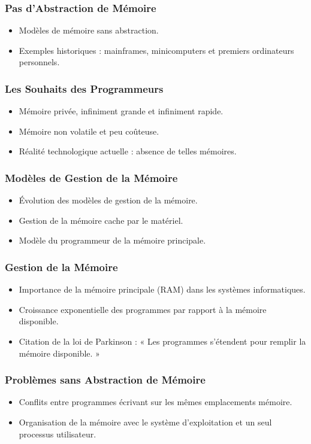 \documentclass[10pt]{beamer}
\begin{document}
\begin{frame}
    \frametitle{Pas d'Abstraction de Mémoire}
    \begin{itemize}
        \item Modèles de mémoire sans abstraction.
        \item Exemples historiques : mainframes, minicomputers et premiers
              ordinateurs personnels.
    \end{itemize}
\end{frame}

\begin{frame}
    \frametitle{Les Souhaits des Programmeurs}
    \begin{itemize}
        \item Mémoire privée, infiniment grande et infiniment rapide.
        \item Mémoire non volatile et peu coûteuse.
        \item Réalité technologique actuelle : absence de telles mémoires.
    \end{itemize}
\end{frame}

\begin{frame}
    \frametitle{Modèles de Gestion de la Mémoire}
    \begin{itemize}
        \item Évolution des modèles de gestion de la mémoire.
        \item Gestion de la mémoire cache par le matériel.
        \item Modèle du programmeur de la mémoire principale.
    \end{itemize}
\end{frame}

\begin{frame}
    \frametitle{Gestion de la Mémoire}
    \begin{itemize}
        \item Importance de la mémoire principale (RAM) dans les systèmes
              informatiques.
        \item Croissance exponentielle des programmes par rapport à la mémoire
              disponible.
        \item Citation de la loi de Parkinson : « Les programmes s'étendent
              pour
              remplir la mémoire disponible. »
    \end{itemize}
\end{frame}

\begin{frame}
    \frametitle{Problèmes sans Abstraction de Mémoire}
    \begin{itemize}
        \item Conflits entre programmes écrivant sur les mêmes emplacements
              mémoire.
        \item Organisation de la mémoire avec le système d'exploitation et un
              seul
              processus utilisateur.
    \end{itemize}
\end{frame}
\end{document}
